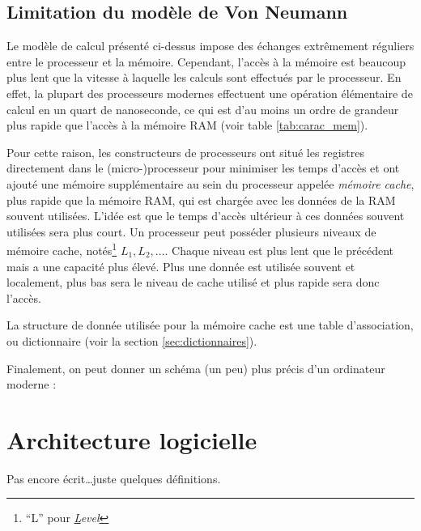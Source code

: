 \documentclass[../../main.tex]{subfiles}
\begin{document}
\subsection{Limitation du modèle de Von Neumann}
\label{sub:limitation_du_mod_le_de_von_neumann}
Le modèle de calcul présenté ci-dessus impose des échanges extrêmement réguliers entre le processeur et la mémoire. Cependant, l'accès à la mémoire est beaucoup plus lent que la vitesse à laquelle les calculs sont effectués par le processeur. En effet, la plupart des processeurs modernes effectuent une opération élémentaire de calcul en un quart de nanoseconde, ce qui est d'au moins un ordre de grandeur plus rapide que l'accès à la mémoire RAM (voir table \ref{tab:carac_mem}).

Pour cette raison, les constructeurs de processeurs ont situé les registres directement dans le (micro-)processeur pour minimiser les temps d'accès et ont ajouté une mémoire supplémentaire au sein du processeur appelée \textit{mémoire cache}, plus rapide que la mémoire RAM, qui est chargée avec les données de la RAM souvent utilisées. L'idée est que le temps d'accès ultérieur à ces données souvent utilisées sera plus court. Un processeur peut posséder plusieurs niveaux de mémoire cache, notés\footnote{``L'' pour \textit{\underline{L}evel}} $L_1, L_2, \dots$. Chaque niveau est plus lent que le précédent mais a une capacité plus élevé. Plus une donnée est utilisée souvent et localement, plus bas sera le niveau de cache utilisé et plus rapide sera donc l'accès. 

La structure de donnée utilisée pour la mémoire cache est une table d'association, ou dictionnaire (voir la section \ref{sec:dictionnaires}).

Finalement, on peut donner un schéma (un peu) plus précis d'un ordinateur moderne : 
\begin{center}
  
\end{center}
\section{Architecture logicielle}
\label{sec:architecture_logicielle}
Pas encore écrit\dots juste quelques définitions.
\end{document}
